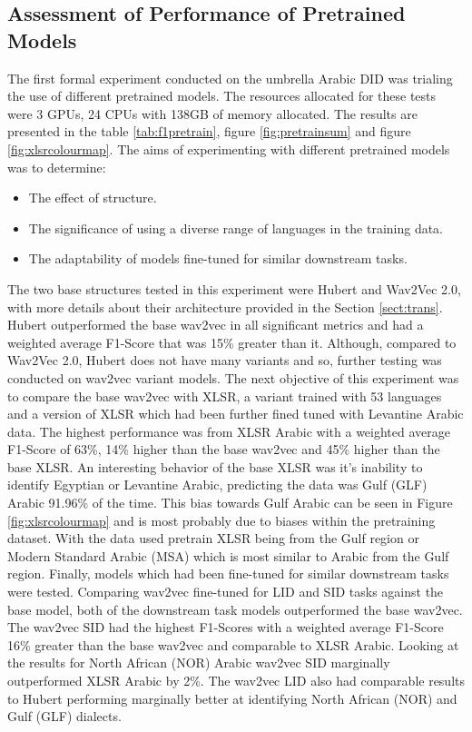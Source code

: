 \subsection{Assessment of Performance of Pretrained Models}\label{sect:pretrainExp}
The first formal experiment conducted on the umbrella Arabic DID was trialing the use of different pretrained models. The resources allocated for these tests were 3 GPUs, 
24 CPUs with 138GB of memory allocated. The results are presented in the table \ref{tab:f1pretrain}, figure \ref{fig:pretrainsum} and figure \ref{fig:xlsrcolourmap}. 
The aims of experimenting with different pretrained models was to determine:
\begin{itemize}
    \item{The effect of structure. }
    \item{The significance of using a diverse range of languages in the training data.
    }
    \item{The adaptability of models fine-tuned for similar downstream tasks. 
    }
\end{itemize}
The two base structures tested in this experiment were Hubert and Wav2Vec 2.0, with more details about their architecture provided in the Section \ref{sect:trans}. 
Hubert outperformed the base wav2vec in all significant metrics and had a weighted average F1-Score that was 15\% greater than it. Although, compared to Wav2Vec 2.0, 
Hubert does not have many variants and so, further testing was conducted on wav2vec variant models. 
The next objective of this experiment was to compare the base wav2vec with 
XLSR, a variant trained with 53 languages and a version of XLSR which had been further fined tuned with Levantine Arabic data. The highest performance was from XLSR Arabic with 
a weighted average F1-Score of 63\%, 14\% higher than the base wav2vec and 45\% higher than the base XLSR. An interesting behavior of the base XLSR was it's inability to 
identify Egyptian or Levantine Arabic, predicting the data was Gulf (GLF) Arabic  91.96\% of the time. This bias towards Gulf Arabic can be seen in Figure \ref{fig:xlsrcolourmap} and 
is most probably due to biases within the pretraining dataset. With the data used pretrain XLSR being from the Gulf region or Modern Standard Arabic (MSA) which is most similar to Arabic from the Gulf region.
Finally, models which had been fine-tuned for similar downstream tasks were tested. Comparing wav2vec fine-tuned for LID and SID tasks against the base model, both of the downstream task models outperformed the base wav2vec. 
The wav2vec SID had the highest F1-Scores with a weighted average F1-Score 16\% greater than the base wav2vec and comparable to XLSR Arabic. Looking at the results for North African (NOR) Arabic 
wav2vec SID marginally outperformed XLSR Arabic by 2\%. The wav2vec LID also had comparable results to Hubert performing marginally better at identifying North African (NOR) and Gulf (GLF) dialects. 

